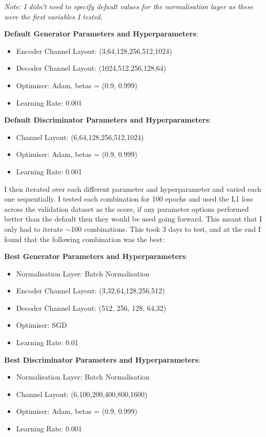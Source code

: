 \documentclass[11pt]{article}
\begin{document}
\emph{Note: I didn't need to specify default values for the normalisation layer as these were the first variables I tested.}

\textbf{Default Generator Parameters and Hyperparameters}: 
\begin{itemize}
\item Encoder Channel Layout: (3,64,128,256,512,1024)
\item Decoder Channel Layout: (1024,512,256,128,64)
\item Optimiser: Adam, betas = (0.9, 0.999)
\item Learning Rate: 0.001
\end{itemize}
\textbf{Default Discriminator Parameters and Hyperparameters}:
\begin{itemize}
\item Channel Layout: (6,64,128,256,512,1024)
\item Optimiser: Adam, betas = (0.9, 0.999)
\item Learning Rate: 0.001
\end{itemize}
I then iterated over each different parameter and hyperparameter and varied each one sequentially. I tested each combination for 100 epochs and used the L1 loss across the validation dataset as the score, if any parameter options performed better than the default then they would be used going forward. This meant that I only had to iterate \(\sim\)100 combinations. This took 3 days to test, and at the end I found that the following combination was the best:

\textbf{Best Generator Parameters and Hyperparameters}:
\begin{itemize}
\item Normalisation Layer: Batch Normalisation 
\item Encoder Channel Layout: (3,32,64,128,256,512)
\item Decoder Channel Layout: (512, 256, 128, 64,32)
\item Optimiser: SGD
\item Learning Rate: 0.01
\end{itemize}
\textbf{Best Discriminator Parameters and Hyperparameters}:
\begin{itemize}
\item Normalisation Layer: Batch Normalisation 
\item Channel Layout: (6,100,200,400,800,1600)
\item Optimiser: Adam, betas = (0.9, 0.999)
\item Learning Rate: 0.001
\end{itemize}
\end{document}
